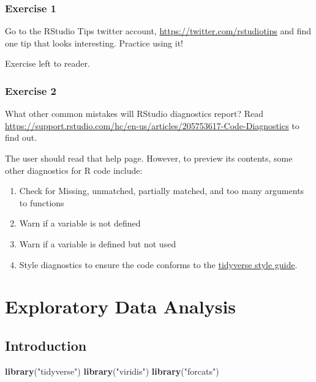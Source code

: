 \documentclass[]{book}
\newenvironment{Shaded}{\begin{snugshade}}{\end{snugshade}}
\newcommand{\KeywordTok}[1]{\textcolor[rgb]{0.13,0.29,0.53}{\textbf{#1}}}
\newcommand{\NormalTok}[1]{#1}
\newcommand{\StringTok}[1]{\textcolor[rgb]{0.31,0.60,0.02}{#1}}
\providecommand{\tightlist}{%
  \setlength{\itemsep}{0pt}\setlength{\parskip}{0pt}}
\theoremstyle{plain}
\theoremstyle{remark}
\theoremstyle{definition}
\theoremstyle{definition}
\theoremstyle{definition}
\theoremstyle{remark}
\begin{document}
\hypertarget{exercise-1-12}{%
\subsection{Exercise 1}\label{exercise-1-12}}

Go to the RStudio Tips twitter account,
\url{https://twitter.com/rstudiotips} and find one tip that looks
interesting. Practice using it!

Exercise left to reader.

\hypertarget{exercise-2-11}{%
\subsection{Exercise 2}\label{exercise-2-11}}

What other common mistakes will RStudio diagnostics report? Read
\url{https://support.rstudio.com/hc/en-us/articles/205753617-Code-Diagnostics}
to find out.

The user should read that help page. However, to preview its contents,
some other diagnostics for R code include:

\begin{enumerate}
\def\labelenumi{\arabic{enumi}.}
\tightlist
\item
  Check for Missing, unmatched, partially matched, and too many
  arguments to functions
\item
  Warn if a variable is not defined
\item
  Warn if a variable is defined but not used
\item
  Style diagnostics to ensure the code conforms to the
  \href{http://adv-r.had.co.nz/Style.html}{tidyverse style guide}.
\end{enumerate}

\hypertarget{exploratory-data-analysis}{%
\chapter{Exploratory Data Analysis}\label{exploratory-data-analysis}}

\hypertarget{introduction-3}{%
\section{Introduction}\label{introduction-3}}

\begin{Shaded}
\begin{Highlighting}[]
\KeywordTok{library}\NormalTok{(}\StringTok{"tidyverse"}\NormalTok{)}
\KeywordTok{library}\NormalTok{(}\StringTok{"viridis"}\NormalTok{)}
\KeywordTok{library}\NormalTok{(}\StringTok{"forcats"}\NormalTok{)}
\end{Highlighting}
\end{Shaded}
\end{document}
